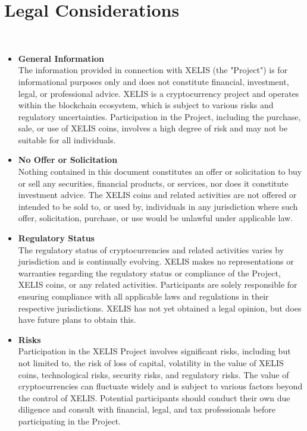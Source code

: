 \documentclass[12pt,a4paper,twocolumn]{article}
\begin{document}
\section{Legal Considerations}\\
\begin{itemize}
\item \textbf{General Information}\\

The information provided in connection with XELIS (the "Project") is for informational purposes only and does not constitute financial, investment, legal, or professional advice. XELIS is a cryptocurrency project and operates within the blockchain ecosystem, which is subject to various risks and regulatory uncertainties. Participation in the Project, including the purchase, sale, or use of XELIS coins, involves a high degree of risk and may not be suitable for all individuals.\\

\item \textbf{No Offer or Solicitation}\\

Nothing contained in this document constitutes an offer or solicitation to buy or sell any securities, financial products, or services, nor does it constitute investment advice. The XELIS coins and related activities are not offered or intended to be sold to, or used by, individuals in any jurisdiction where such offer, solicitation, purchase, or use would be unlawful under applicable law.\\

\item \textbf{Regulatory Status}\\

The regulatory status of cryptocurrencies and related activities varies by jurisdiction and is continually evolving. XELIS makes no representations or warranties regarding the regulatory status or compliance of the Project, XELIS coins, or any related activities. Participants are solely responsible for ensuring compliance with all applicable laws and regulations in their respective jurisdictions. XELIS has not yet obtained a legal opinion, but does have future plans to obtain this. \\

\item \textbf{Risks}\\

Participation in the XELIS Project involves significant risks, including but not limited to, the risk of loss of capital, volatility in the value of XELIS coins, technological risks, security risks, and regulatory risks. The value of cryptocurrencies can fluctuate widely and is subject to various factors beyond the control of XELIS. Potential participants should conduct their own due diligence and consult with financial, legal, and tax professionals before participating in the Project.\\


\end{itemize}
\end{document}
